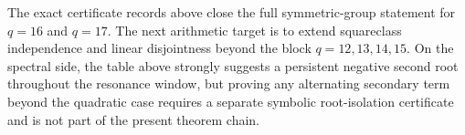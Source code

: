 \begin{remark}
\label{rem:q16q17}
The exact certificate records above close the full symmetric-group statement for
\(q=16\) and \(q=17\).
The next arithmetic target is to extend squareclass independence and linear
disjointness beyond the block \(q=12,13,14,15\).  On the spectral side, the
table above strongly suggests a persistent negative second root throughout the
resonance window, but proving any alternating secondary term beyond the
quadratic case requires a separate symbolic root-isolation certificate and is
not part of the present theorem chain.
\end{remark}
